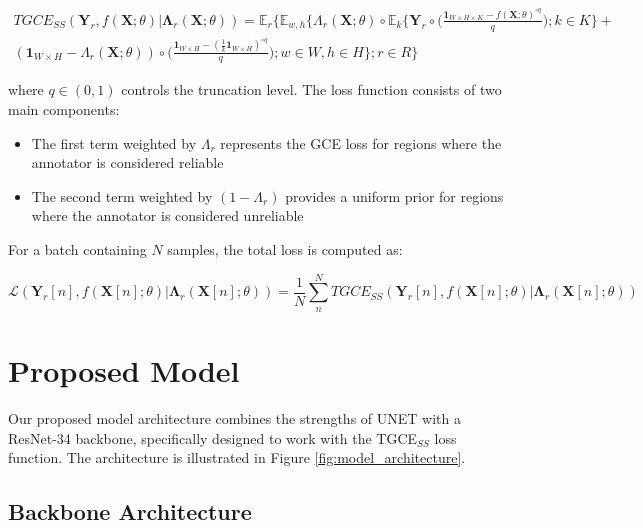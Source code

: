 \begin{equation}
  \begin{split}
    TGCE_{SS}(\mathbf{Y}_r,f(\mathbf X;\theta) | \mathbf{\Lambda}_r
    (\mathbf X;\theta)) = \mathbb E_{r} \Bigg\{ \mathbb E_{w,h}
      \Bigg\{ \Lambda_r (\mathbf X; \theta) \circ \mathbb E_k \bigg\{
          \mathbf Y_r \circ \bigg( \frac{\mathbf 1 _{W\times H \times
        K} - f(\mathbf X;\theta) ^{\circ q }}{q} \bigg); k \in K  \bigg\}  + \\
        \left(\mathbf 1 _{W \times H } - \Lambda _r (\mathbf
        X;\theta)\right) \circ \bigg(   \frac{\mathbf 1_{W\times H} -
        (\frac {1}{k} \mathbf 1_{W\times H})^{\circ q}}{q} \bigg); w \in
    W, h \in H \Bigg\};r\in R\Bigg\}
  \end{split}
\end{equation}

where $q \in (0,1)$ controls the truncation level. The loss function
consists of two main components:

\begin{itemize}
  \item The first term weighted by $\Lambda_r$ represents the GCE
    loss for regions where the annotator is considered reliable
  \item The second term weighted by $(1-\Lambda_r)$ provides a
    uniform prior for regions where the annotator is considered unreliable
\end{itemize}

For a batch containing $N$ samples, the total loss is computed as:

\begin{equation}
  \mathscr{L}\left(\mathbf{Y}_r[n],f(\mathbf X[n];\theta) |
  \mathbf{\Lambda}_r (\mathbf X[n];\theta)\right)  = \frac{1}{N}
  \sum_{n}^N TGCE_{SS}(\mathbf{Y}_r[n],f(\mathbf X[n];\theta) |
  \mathbf{\Lambda}_r (\mathbf X[n];\theta))
\end{equation}

\section{Proposed Model}

Our proposed model architecture combines the strengths of UNET with a
ResNet-34 backbone, specifically designed to work with the
TGCE$_{SS}$ loss function. The architecture is illustrated in Figure
\ref{fig:model_architecture}.

\subsection{Backbone Architecture}

